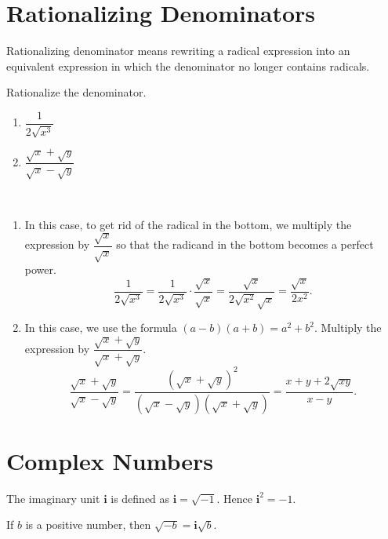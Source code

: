 \documentclass[en,12pt]{elegantbook}
\providecommand{\tightlist}{%
  \setlength{\itemsep}{0pt}\setlength{\parskip}{0pt}}
\newcommand{\ii}{\mathbf{i}}
\let\BeginKnitrBlock\begin \let\EndKnitrBlock\end
\begin{document}
\hypertarget{rationalizing-denominators}{%
\section{Rationalizing Denominators}\label{rationalizing-denominators}}

Rationalizing denominator means rewriting a radical expression into an equivalent expression in which the denominator no longer contains radicals.

\BeginKnitrBlock{example}
\protect\hypertarget{exm:unnamed-chunk-92}{}{\label{exm:unnamed-chunk-92} }
Rationalize the denominator.

\begin{enumerate}
\def\labelenumi{\arabic{enumi}.}
\tightlist
\item
  \(\dfrac{1}{2\sqrt{x^3}}\)
\item
  \(\dfrac{\sqrt{x}+\sqrt{y}}{\sqrt{x}-\sqrt{y}}\)
\end{enumerate}
\EndKnitrBlock{example}

\BeginKnitrBlock{solution}
{}\\

\begin{enumerate}
\def\labelenumi{\arabic{enumi}.}
\tightlist
\item
  In this case, to get rid of the radical in the bottom, we multiply the expression by \(\dfrac{\sqrt{x}}{\sqrt{x}}\) so that the radicand in the bottom becomes a perfect power.
  \[
   \dfrac{1}{2\sqrt{x^3}}=\dfrac{1}{2\sqrt{x^3}}\cdot\dfrac{\sqrt{x}}{\sqrt{x}}=\dfrac{\sqrt{x}}{2\sqrt{x^2}\sqrt{x}}=\dfrac{\sqrt{x}}{2x^2}.  
   \]
\item
  In this case, we use the formula \((a-b)(a+b)=a^2+b^2\). Multiply the expression by \(\dfrac{\sqrt{x}+\sqrt{y}}{\sqrt{x}+\sqrt{y}}\).
  \[
   \dfrac{\sqrt{x}+\sqrt{y}}{\sqrt{x}-\sqrt{y}}=\dfrac{(\sqrt{x}+\sqrt{y})^2}{(\sqrt{x}-\sqrt{y})(\sqrt{x}+\sqrt{y})}=\dfrac{x+y+2\sqrt{xy}}{x-y}.
   \]
\end{enumerate}
\EndKnitrBlock{solution}

\hypertarget{complex-numbers}{%
\section{Complex Numbers}\label{complex-numbers}}

The imaginary unit \(\ii\) is defined as \(\ii=\sqrt{-1}\). Hence \(\ii^2=-1\).

If \(b\) is a positive number, then \(\sqrt{-b}=\ii\sqrt{b}\).
\end{document}

